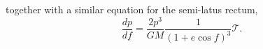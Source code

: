 together with a similar equation for the semi-latus rectum,
\begin{equation}
\frac{dp}{df} = \frac{2p^3}{GM} \frac{1}{(1+e\cos f)^3} \mathcal{T} .
\end{equation}




